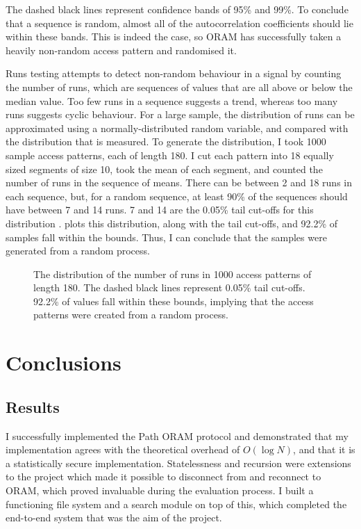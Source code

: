 \documentclass[12pt,a4paper,twoside,openright]{report}
\begin{document}
The dashed black lines represent confidence bands of 95\% and 99\%. To conclude that a sequence is random, almost all of the autocorrelation coefficients should lie within these bands. This is indeed the case, so ORAM has successfully taken a heavily non-random access pattern and randomised it.

Runs testing attempts to detect non-random behaviour in a signal by counting the number of runs, which are sequences of values that are all above or below the median value. Too few runs in a sequence suggests a trend, whereas too many runs suggests cyclic behaviour. For a large sample, the distribution of runs can be approximated using a normally-distributed random variable, and compared with the distribution that is measured. To generate the distribution, I took 1000 sample access patterns, each of length 180. I cut each pattern into 18 equally sized segments of size 10, took the mean of each segment, and counted the number of runs in the sequence of means. There can be between 2 and 18 runs in each sequence, but, for a random sequence, at least 90\% of the sequences should have between 7 and 14 runs. 7 and 14 are the 0.05\% tail cut-offs for this distribution \cite{masliah2000stationarity}.  plots this distribution, along with the tail cut-offs, and 92.2\% of samples fall within the bounds. Thus, I can conclude that the samples were generated from a random process.

\begin{figure}
    \centering
    
    \caption{The distribution of the number of runs in 1000 access patterns of length 180. The dashed black lines represent 0.05\% tail cut-offs. 92.2\% of values fall within these bounds, implying that the access patterns were created from a random process.}
    \label{fig:runsTestPlot}
\end{figure}

\chapter{Conclusions}

\section{Results}

I successfully implemented the Path ORAM protocol and demonstrated that my implementation agrees with the theoretical overhead of $O(\log N)$, and that it is a statistically secure implementation. Statelessness and recursion were extensions to the project which made it possible to disconnect from and reconnect to ORAM, which proved invaluable during the evaluation process. I built a functioning file system and a search module on top of this, which completed the end-to-end system that was the aim of the project.
\end{document}
